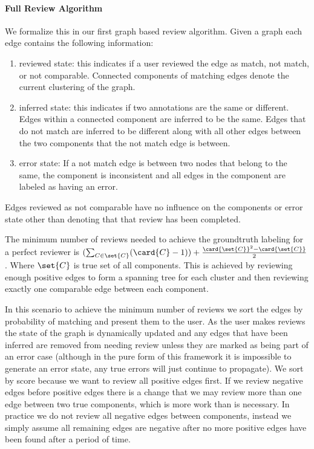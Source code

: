 \paragraph{Full Review Algorithm}
We formalize this in our first graph based review algorithm.
Given a graph each edge contains the following information:
\begin{enumerate}
    \item reviewed state:
    this indicates if a user reviewed the edge as match, not match, or not
      comparable.
    Connected components of matching edges denote the current clustering of the graph.

    \item inferred state:
    this indicates if two annotations are the same or different.
    Edges within a connected component are inferred to be the same.
    Edges that do not match are inferred to be different along with all other
      edges between the two components that the not match edge is between.

    \item error state:
    If a not match edge is between two nodes that belong to the same, the
      component is inconsistent and all edges in the component are labeled as
      having an error.
\end{enumerate}
Edges reviewed as not comparable have no influence on the components or error
  state other than denoting that that review has been completed.

The minimum number of reviews needed to achieve the groundtruth labeling for a
  perfect reviewer is $(\sum_{C \in \set{C}} (\card{C} - 1)) +
  \frac{\card{\set{C}}^2 - \card{\set{C}}}{2}$.
Where $\set{C}$ is true set of all components.
This is achieved by reviewing enough positive edges to form a spanning tree
  for each cluster and then reviewing exactly one comparable edge between each
  component.

In this scenario to achieve the minimum number of reviews we sort the edges by
  probability of matching and present them to the user.
As the user makes reviews the state of the graph is dynamically updated and
  any edges that have been inferred are removed from needing review unless they
  are marked as being part of an error case (although in the pure form of this
  framework it is impossible to generate an error state, any true errors will
  just continue to propagate).
We sort by score because we want to review all positive edges first.
If we review negative edges before positive edges there is a change that we
  may review more than one edge between two true components, which is more work
  than is necessary.
In practice we do not review all negative edges between components, instead we
  simply assume all remaining edges are negative after no more positive edges
  have been found after a period of time.

